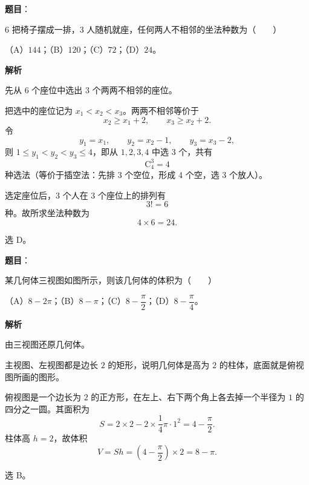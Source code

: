 \begin{answer}

\textbf{题目}：

6 把椅子摆成一排，3 人随机就座，任何两人不相邻的坐法种数为\mbox{（　　）}

（A）$144$；（B）$120$；（C）$72$；（D）$24$。

\textbf{解析}

先从 6 个座位中选出 3 个两两不相邻的座位。

把选中的座位记为 $x_1<x_2<x_3$。两两不相邻等价于
\nopagebreak[4]
\[x_2\geqslant x_1+2,\qquad x_3\geqslant x_2+2.\]
令
\nopagebreak[4]
\[y_1=x_1,\qquad y_2=x_2-1,\qquad y_3=x_3-2,\]
则 $1\leqslant y_1<y_2<y_3\leqslant 4$，即从 $1,2,3,4$ 中选 3 个，共有
\nopagebreak[4]
\[\mathrm C_4^3=4\]
种选法（等价于插空法：先排 3 个空位，形成 4 个空，选 3 个放人）。

选定座位后，3 个人在 3 个座位上的排列有
\nopagebreak[4]
\[3!=6\]
种。故所求坐法种数为
\nopagebreak[4]
\[4\times6=24.\]

选 D。


\end{answer}
\begin{answer}

\textbf{题目}：

某几何体三视图如图所示，则该几何体的体积为\mbox{（　　）}
\nopagebreak[4]
\begin{center}\end{center}
\nopagebreak[4]
（A）$8-2\pi$；（B）$8-\pi$；（C）$8-\dfrac\pi2$；（D）$8-\dfrac\pi4$。

\textbf{解析}

由三视图还原几何体。

主视图、左视图都是边长 $2$ 的矩形，说明几何体是高为 $2$ 的柱体，底面就是俯视图所画的图形。

俯视图是一个边长为 $2$ 的正方形，在左上、右下两个角上各去掉一个半径为 $1$ 的四分之一圆。其面积为
\nopagebreak[4]
\[S=2\times2-2\times\frac14\pi\cdot1^2=4-\frac\pi2.\]
柱体高 $h=2$，故体积
\nopagebreak[4]
\[V=Sh=\left(4-\frac\pi2\right)\times2=8-\pi.\]

选 B。


\end{answer}
